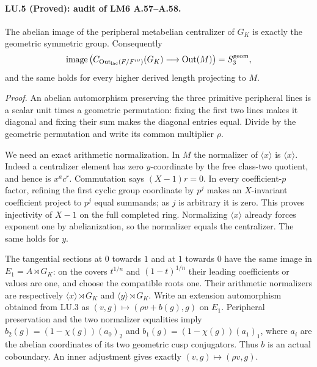 \paragraph{LU.5 (Proved): audit of LM6 A.57--A.58.}
The abelian image of the peripheral metabelian centralizer
of $G_K$ is exactly the geometric symmetric group. Consequently
\[
 \operatorname{image}\left(
 C_{\operatorname{Out}_{\rm lac}(F/F''')}(G_K)
       \longrightarrow\operatorname{Out}(M)\right)
       =S_3^{\rm geom},
\]
and the same holds for every higher derived length projecting
to $M$.

\emph{Proof.}
An abelian automorphism preserving the three primitive
peripheral lines is a scalar unit times a geometric permutation:
fixing the first two lines makes it diagonal and fixing their
sum makes the diagonal entries equal. Divide by the geometric
permutation and write its common multiplier $\rho$.

We need an exact arithmetic normalization. In $M$ the normalizer
of $\langle x\rangle$ is $\langle x\rangle$. Indeed a centralizer
element has zero $y$-coordinate by the free class-two quotient,
and hence is $x^a c^r$. Commutation says $(X-1)r=0$. In every
coefficient-$p$ factor, refining the first cyclic group coordinate
by $p^j$ makes an $X$-invariant coefficient project to $p^j$
equal summands; as $j$ is arbitrary it is zero. This proves
injectivity of $X-1$ on the full completed ring. Normalizing
$\langle x\rangle$ already forces exponent one by abelianization,
so the normalizer equals the centralizer. The same holds for $y$.

The tangential sections at $0$ towards $1$ and at $1$ towards
$0$ have the same image in $E_1=A\rtimes G_K$: on the covers
$t^{1/n}$ and $(1-t)^{1/n}$ their leading coefficients or values
are one, and choose the compatible roots one. Their arithmetic
normalizers are respectively $\langle x\rangle\rtimes G_K$
and $\langle y\rangle\rtimes G_K$. Write an extension
automorphism obtained from LU.3 as
$(v,g)\mapsto(\rho v+b(g),g)$ on $E_1$. Peripheral preservation
and the two normalizer equalities imply
$b_2(g)=(1-\chi(g))(a_0)_2$ and
$b_1(g)=(1-\chi(g))(a_1)_1$, where $a_i$ are the abelian
coordinates of its two geometric cusp conjugators. Thus $b$
is an actual coboundary. An inner adjustment gives exactly
$(v,g)\mapsto(\rho v,g)$.

